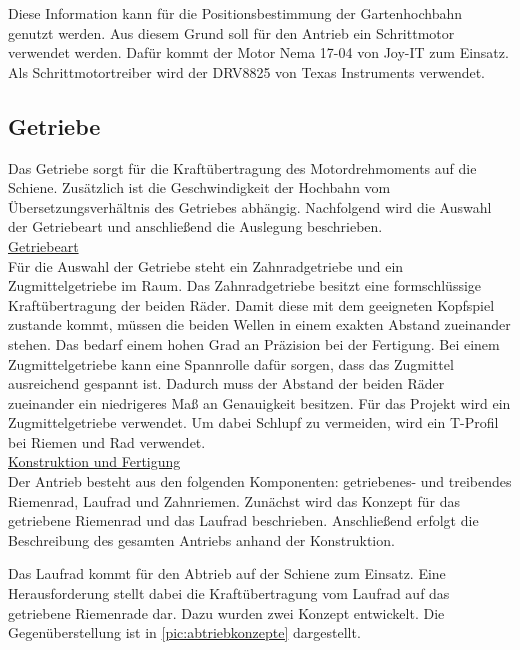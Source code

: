Diese Information kann für die Positionsbestimmung der Gartenhochbahn genutzt werden. Aus diesem Grund soll für den Antrieb ein Schrittmotor verwendet werden. Dafür kommt der Motor Nema 17-04 von Joy-IT zum Einsatz. Als Schrittmotortreiber wird der DRV8825 von Texas Instruments verwendet. 



\subsection{Getriebe}
\label{sec:getriebekonzept}
Das Getriebe sorgt für die Kraftübertragung des Motordrehmoments auf die Schiene. Zusätzlich ist die Geschwindigkeit der Hochbahn vom Übersetzungsverhältnis des Getriebes abhängig. Nachfolgend wird die Auswahl der Getriebeart und anschließend die Auslegung beschrieben. \\

\underline{Getriebeart}\\
Für die Auswahl der Getriebe steht ein Zahnradgetriebe und ein Zugmittelgetriebe im Raum. Das Zahnradgetriebe besitzt eine formschlüssige Kraftübertragung der beiden Räder. Damit diese mit dem geeigneten Kopfspiel zustande kommt, müssen die beiden Wellen in einem exakten Abstand zueinander stehen. Das bedarf einem hohen Grad an Präzision bei der Fertigung. Bei einem Zugmittelgetriebe kann eine Spannrolle dafür sorgen, dass das Zugmittel ausreichend gespannt ist. Dadurch muss der Abstand der beiden Räder zueinander ein niedrigeres Maß an Genauigkeit besitzen. 
Für das Projekt wird ein Zugmittelgetriebe verwendet. Um dabei Schlupf zu vermeiden, wird ein T-Profil bei Riemen und Rad verwendet. 
\\


\underline{Konstruktion und Fertigung}\\
Der Antrieb besteht aus den folgenden Komponenten: getriebenes- und treibendes Riemenrad, Laufrad und Zahnriemen. Zunächst wird das Konzept für das getriebene Riemenrad und das Laufrad beschrieben. Anschließend erfolgt die Beschreibung des gesamten Antriebs anhand der Konstruktion.  

Das Laufrad kommt für den Abtrieb auf der Schiene zum Einsatz. Eine Herausforderung stellt dabei die Kraftübertragung vom Laufrad auf das getriebene Riemenrade dar. Dazu wurden zwei Konzept entwickelt. Die Gegenüberstellung ist in \autoref{pic:abtriebkonzepte} dargestellt.

